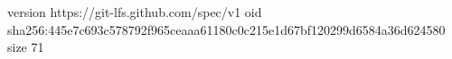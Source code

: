 version https://git-lfs.github.com/spec/v1
oid sha256:445e7c693c578792f965ceaaa61180c0c215e1d67bf120299d6584a36d624580
size 71
